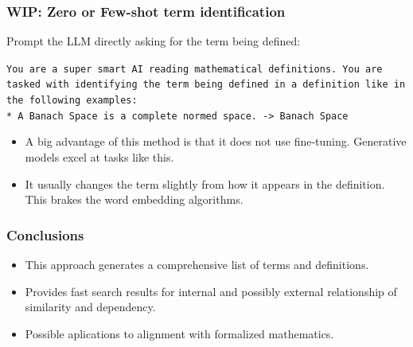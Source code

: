 \documentclass[10pt]{beamer}
\begin{document}
\begin{frame}
    \frametitle{WIP: Zero or Few-shot term identification}
Prompt the LLM directly asking for the term being defined:
\begin{example}
    \texttt{You are a super smart AI reading mathematical definitions. You are tasked with identifying the term being defined in a definition like in the following examples:\\
    * A Banach Space is a complete normed space. -> Banach Space}
\end{example}
\pause
    \begin{itemize}
        \item A big advantage of this method is that it does not use fine-tuning. Generative models excel at tasks like this.
            \pause
        \item  It usually changes the term slightly from how it appears in the definition. This brakes the word embedding algorithms.
    \end{itemize}
\end{frame}


\begin{frame}
    \frametitle{Conclusions}
    \begin{itemize}
        \item This approach  generates a comprehensive list of terms and definitions.
        \item Provides fast search results for internal and possibly external relationship of similarity and dependency.
        \item Possible aplications to alignment with formalized mathematics.
    \end{itemize}
\end{frame}

\begin{frame}
\titlepage
\end{frame}
\end{document}
